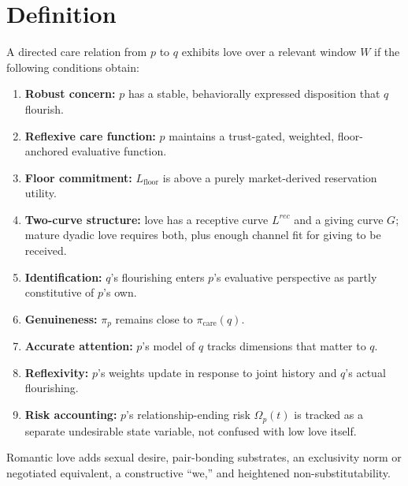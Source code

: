 \documentclass[11pt]{article}
\newcommand{\Lfloor}{L_{\mathrm{floor}}}
\newcommand{\pcare}{\pi_{\mathrm{care}}}
\newcommand{\Risk}{\Omega}
\begin{document}
\section{Definition}
A directed care relation from $p$ to $q$ exhibits love over a relevant window $W$ if the following conditions obtain:

\begin{enumerate}
\item \textbf{Robust concern:} $p$ has a stable, behaviorally expressed disposition that $q$ flourish.
\item \textbf{Reflexive care function:} $p$ maintains a trust-gated, weighted, floor-anchored evaluative function.
\item \textbf{Floor commitment:} $\Lfloor$ is above a purely market-derived reservation utility.
\item \textbf{Two-curve structure:} love has a receptive curve $L^{rec}$ and a giving curve $G$; mature dyadic love requires both, plus enough channel fit for giving to be received.
\item \textbf{Identification:} $q$'s flourishing enters $p$'s evaluative perspective as partly constitutive of $p$'s own.
\item \textbf{Genuineness:} $\pi_p$ remains close to $\pcare(q)$.
\item \textbf{Accurate attention:} $p$'s model of $q$ tracks dimensions that matter to $q$.
\item \textbf{Reflexivity:} $p$'s weights update in response to joint history and $q$'s actual flourishing.
\item \textbf{Risk accounting:} $p$'s relationship-ending risk $\Risk_p(t)$ is tracked as a separate undesirable state variable, not confused with low love itself.
\end{enumerate}

Romantic love adds sexual desire, pair-bonding substrates, an exclusivity norm or negotiated equivalent, a constructive ``we,'' and heightened non-substitutability.
\end{document}
